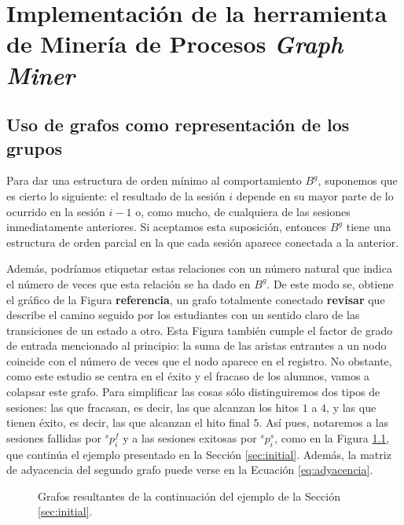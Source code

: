 \chapter{Implementación de la herramienta de Minería de Procesos \emph{Graph Miner}}\label{sec:chapterIV}

\section{Uso de grafos como representación de los grupos}

Para dar una estructura de orden mínimo al comportamiento $B^g$, suponemos que es cierto lo siguiente: el resultado de la sesión $i$ depende en su mayor parte de lo ocurrido en la sesión $i-1$ o, como mucho, de cualquiera de las sesiones inmediatamente anteriores. Si aceptamos esta suposición, entonces $B^g$ tiene una estructura de orden parcial en la que cada sesión aparece conectada a la anterior.

Además, podríamos etiquetar estas relaciones con un número natural que indica el número de veces que esta relación se ha dado en $B^g$. De este modo se, obtiene el gráfico de la Figura \textbf{referencia}, un grafo totalmente conectado \textbf{revisar} que describe el camino seguido por los estudiantes con un sentido claro de las transiciones de un estado a otro. Esta Figura también cumple el factor de grado de entrada mencionado al principio: la suma de las aristas entrantes a un nodo coincide con el número de veces que el nodo aparece en el registro. No obstante, como este estudio se centra en el éxito y el fracaso de los alumnos, vamos a colapsar este grafo. Para simplificar las cosas sólo distinguiremos dos tipos de sesiones: las que fracasan, es decir, las que alcanzan los hitos $1$ a $4$, y las que tienen éxito, es decir, las que alcanzan el hito final $5$. Así pues, notaremos a las sesiones fallidas por $^sp_i^f$ y a las sesiones exitosas por $^sp_i^s$, como en la Figura \ref{fig:examples}, que continúa el ejemplo presentado en la Sección \ref{sec:initial}. Además, la matriz de adyacencia del segundo grafo puede verse en la Ecuación \ref{eq:adyacencia}.

\begin{figure}[H]
\centering
{}\qquad
{}
\caption{Grafos resultantes de la continuación del ejemplo de la Sección \ref{sec:initial}.}
\label{fig:examples}
\end{figure}

